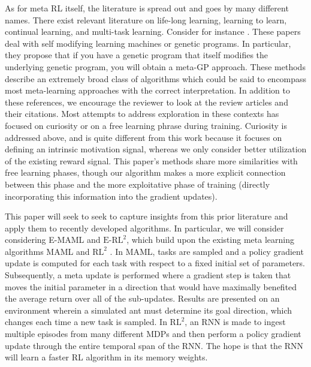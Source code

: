 \documentclass{article} %
\begin{document}
As for meta RL itself, the literature is spread out and goes by many different names. There exist relevant literature on life-long learning, learning to learn, continual learning, and multi-task learning. Consider for instance \cite{schex5, schex6}. These papers deal with self modifying learning machines or genetic programs. In particular, they propose that if you have a genetic program that itself modifies the underlying genetic program, you will obtain a meta-GP approach. These methods describe an extremely broad class of algorithms which could be said to encompass most meta-learning approaches with the correct interpretation. In addition to these references, we encourage the reviewer to look at the review articles \cite{lllrev, tlrev, thurn} and their citations. Most attempts to address exploration in these contexts has focused on curiosity or on a free learning phrase during training. Curiosity is addressed above, and is quite different from this work because it focuses on defining an intrinsic motivation signal, whereas we only consider better utilization of the existing reward signal. This paper's methods share more similarities with free learning phases, though our algorithm makes a more explicit connection between this phase and the more exploitative phase of training (directly incorporating this information into the gradient updates).  


This paper will seek to seek to capture insights from this prior literature and apply them to recently developed algorithms. In particular, we will consider considering E-MAML and  $\text{E-RL}^2$, which build upon the existing meta learning algorithms MAML \citep{maml} and $\text{RL}^2$ \citep{rl2}. In MAML, tasks are sampled and a policy gradient update is computed for each task with respect to a fixed initial set of parameters. Subsequently, a meta update is performed where a gradient step is taken that moves the initial parameter in a direction that would have maximally benefited the average return over all of the sub-updates. Results are presented on an environment wherein a simulated ant must determine its goal direction, which changes each time a new task is sampled. In $ \text{RL}^2$, an RNN is made to ingest multiple episodes from many different MDPs and then perform a policy gradient update through the entire temporal span of the RNN. The hope is that the RNN will learn a faster RL algorithm in its memory weights. 
\end{document}
